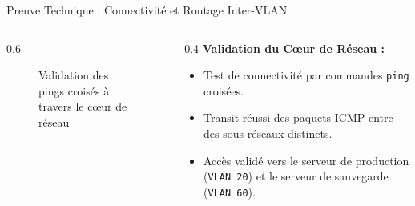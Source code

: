 \begin{frame}{Preuve Technique : Connectivité et Routage Inter-VLAN}
    \begin{columns}[T]
        \begin{column}{0.6\textwidth}
            \begin{figure}
                \centering
                \caption{Validation des pings croisés à travers le cœur de réseau}
            \end{figure}
        \end{column}
        
        \begin{column}{0.4\textwidth}
            \textbf{Validation du Cœur de Réseau :}
            \begin{itemize}
                \item Test de connectivité par commandes \texttt{ping} croisées.
                \item Transit réussi des paquets ICMP entre des sous-réseaux distincts.
                \item Accès validé vers le serveur de production (\texttt{VLAN 20}) et le serveur de sauvegarde (\texttt{VLAN 60}).
            \end{itemize}
        \end{column}
    \end{columns}
\end{frame}




